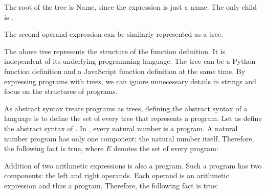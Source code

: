 The root of the tree is Name, since the expression is just a name. The
only child is .

The second operand expression can be similarly represented as a tree.

\begin{center}
\end{center}

The above tree represents the structure of the function definition. It is
independent of its underlying programming language. The tree can be a Python
function definition and a JavaScript function definition at the same time. By
expressing programs with trees, we can ignore unnecessary details in strings and
focus on the structures of programs.

As abstract syntax treats programs as trees, defining the abstract syntax of a
language is to define the set of every tree that represents a program. Let us
define the abstract syntax of \lang. In \lang, every natural number is a
program. A natural number program has only one component: the natural number
itself. Therefore, the following fact is true, where $E$ denotes the set of
every program:

\begin{center}
\end{center}

Addition of two arithmetic expressions is also a program. Such a program has
two components: the left and right operands. Each operand is an arithmetic
expression and thus a program. Therefore, the following fact is true:

